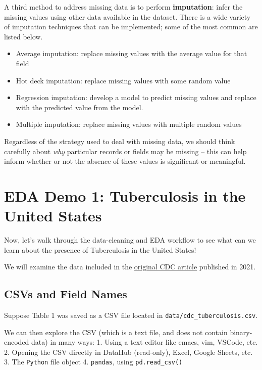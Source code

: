 \documentclass[
  letterpaper,
  DIV=11,
  numbers=noendperiod]{scrreprt}
\providecommand{\tightlist}{%
  \setlength{\itemsep}{0pt}\setlength{\parskip}{0pt}}\usepackage{longtable,booktabs,array}
\begin{document}
A third method to address missing data is to perform
\textbf{imputation}: infer the missing values using other data available
in the dataset. There is a wide variety of imputation techniques that
can be implemented; some of the most common are listed below.

\begin{itemize}
\tightlist
\item
  Average imputation: replace missing values with the average value for
  that field
\item
  Hot deck imputation: replace missing values with some random value
\item
  Regression imputation: develop a model to predict missing values and
  replace with the predicted value from the model.
\item
  Multiple imputation: replace missing values with multiple random
  values
\end{itemize}

Regardless of the strategy used to deal with missing data, we should
think carefully about \emph{why} particular records or fields may be
missing -- this can help inform whether or not the absence of these
values is significant or meaningful.

\section{EDA Demo 1: Tuberculosis in the United
States}\label{eda-demo-1-tuberculosis-in-the-united-states}

Now, let's walk through the data-cleaning and EDA workflow to see what
can we learn about the presence of Tuberculosis in the United States!

We will examine the data included in the
\href{https://www.cdc.gov/mmwr/volumes/71/wr/mm7112a1.htm?s_cid=mm7112a1_w\#T1_down}{original
CDC article} published in 2021.

\subsection{CSVs and Field Names}\label{csvs-and-field-names}

Suppose Table 1 was saved as a CSV file located in
\texttt{data/cdc\_tuberculosis.csv}.

We can then explore the CSV (which is a text file, and does not contain
binary-encoded data) in many ways: 1. Using a text editor like emacs,
vim, VSCode, etc. 2. Opening the CSV directly in DataHub (read-only),
Excel, Google Sheets, etc. 3. The \texttt{Python} file object 4.
\texttt{pandas}, using \texttt{pd.read\_csv()}
\end{document}

